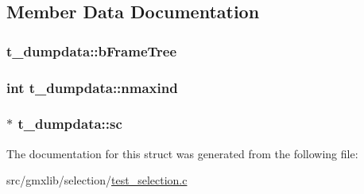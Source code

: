 \subsection{\-Member \-Data \-Documentation}
\hypertarget{structt__dumpdata_a0363a5efa9cc9cc56862bff662784219}{
\subsubsection[{b\-Frame\-Tree}]{ {\bf t\-\_\-dumpdata\-::b\-Frame\-Tree}}}\label{structt__dumpdata_a0363a5efa9cc9cc56862bff662784219}
\hypertarget{structt__dumpdata_a28faf06ec85500c8252d4d3526db69ae}{
\subsubsection[{nmaxind}]{\setlength{\rightskip}{0pt plus 5cm}int {\bf t\-\_\-dumpdata\-::nmaxind}}}\label{structt__dumpdata_a28faf06ec85500c8252d4d3526db69ae}
\hypertarget{structt__dumpdata_ae7f557e75dd65fd0be9e56c9dbe1f162}{
\subsubsection[{sc}]{$\ast$ {\bf t\-\_\-dumpdata\-::sc}}}\label{structt__dumpdata_ae7f557e75dd65fd0be9e56c9dbe1f162}


\-The documentation for this struct was generated from the following file\-:\begin{DoxyCompactItemize}
\item 
src/gmxlib/selection/\hyperlink{test__selection_8c}{test\-\_\-selection.\-c}\end{DoxyCompactItemize}

